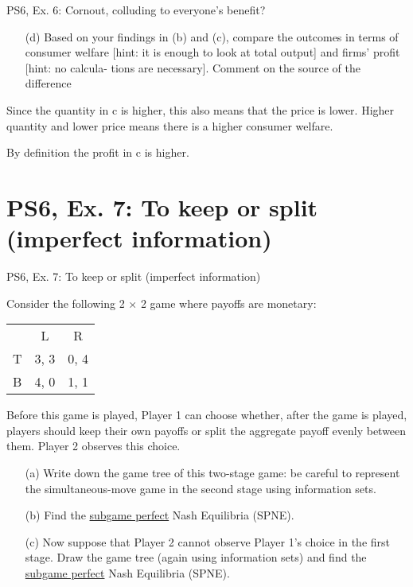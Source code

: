 \begin{frame}{PS6, Ex. 6: Cornout, colluding to everyone's benefit?}
    \begin{itemize}
    \item[(d)] Based on your findings in (b) and (c), compare the outcomes in terms of consumer
welfare [hint: it is enough to look at total output] and firms’ profit [hint: no calcula-
tions are necessary]. Comment on the source of the difference
    \end{itemize}
    \vfill\null
Since the quantity in c is higher, this also means that the price is lower. Higher quantity and lower price means there is a higher consumer welfare.

By definition the profit in c is higher.

\vfill\null
\end{frame}


\section{PS6, Ex. 7: To keep or split (imperfect information)}

\begin{frame}{PS6, Ex. 7: To keep or split (imperfect information)}
  \begin{multicols}{2}
    Consider the following 2 × 2 game where payoffs are monetary:
    \begin{table}
      \begin{tabular}{l|c|c|}
          \multicolumn{1}{c}{} & \multicolumn{1}{c}{L} & \multicolumn{1}{c}{R} \\\cline{2-3}
          T & 3, 3 & 0, 4 \\\cline{2-3}
          B & 4, 0 & 1, 1 \\\cline{2-3}
      \end{tabular}
    \end{table}
    Before this game is played, Player 1 can choose whether, after the game is played, players should keep their own payoffs or split the aggregate payoff evenly between them. Player 2 observes this choice.
  \vfill\null \columnbreak
    \begin{itemize}
      \item[(a)] Write down the game tree of this two-stage game: be careful to represent the simultaneous-move game in the second stage using information sets.
      \item[(b)] Find the \underline{subgame perfect} Nash Equilibria (SPNE).
      \item[(c)] Now suppose that Player 2 cannot observe Player 1’s choice in the first stage. Draw the game tree (again using information sets) and find the \underline{subgame perfect} Nash Equilibria (SPNE).
    \end{itemize}
  \vfill\null
  \end{multicols}
\end{frame}


